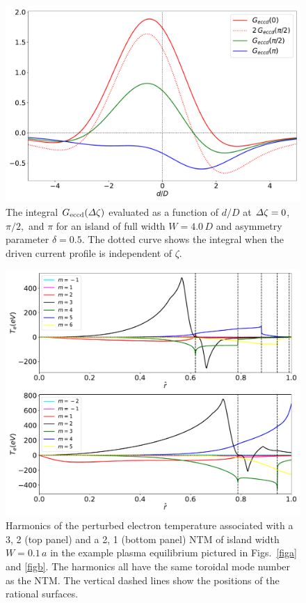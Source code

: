 \documentclass{iopjournal}
\begin{document}
\begin{figure}
\centerline{\includegraphics[width=\textwidth]{Fig11.pdf}}
\caption{The integral $G_{\rm eccd}({\mit\Delta}\zeta)$ evaluated as a function of $d/D$ at ${\mit\Delta}\zeta = 0$, $\pi/2,$ and $\pi$ for an  island
of full width $W=4.0\,D$ and asymmetry parameter $\delta=0.5$. The dotted curve shows the integral when the driven current profile is independent of $\zeta$.\label{fig9}}
\end{figure}

\begin{figure}
\centerline{\includegraphics[width=\textwidth]{Fig12.pdf}}
\caption{Harmonics of the perturbed electron temperature associated with a 3, 2 (top panel) and a 2, 1 (bottom panel) NTM of island width $W=0.1\,a$ in the example plasma equilibrium pictured in Figs.~\ref{figa}
and \ref{figb}. The harmonics all have the same toroidal mode number as the NTM. The vertical dashed lines show the positions of the rational surfaces. \label{fig10}}
\end{figure}
\end{document}

